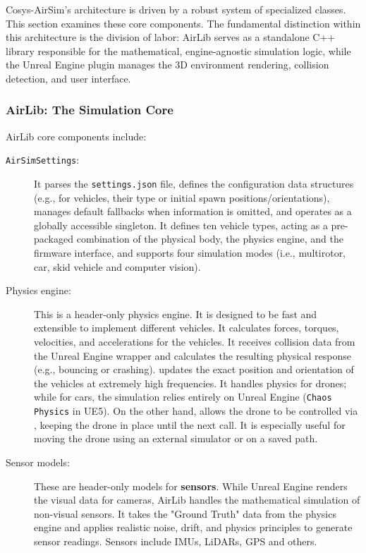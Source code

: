 Cosys-AirSim's architecture is driven by a robust system of specialized classes. This section examines these core components. The fundamental distinction within this architecture is the division of labor: AirLib serves as a standalone C++ library responsible for the mathematical, engine-agnostic simulation logic, while the Unreal Engine plugin manages the 3D environment rendering, collision detection, and user interface.

\subsubsection{AirLib: The Simulation Core}
\noindent
AirLib core components include:

\begin{description}
    \item[\texttt{AirSimSettings}:] It parses the \texttt{settings.json} file, defines the configuration data structures (e.g., for vehicles, their type or initial spawn positions/orientations), manages default fallbacks when information is omitted, and operates as a globally accessible singleton.
    It defines ten vehicle types, acting as a pre-packaged combination of the physical body, the physics engine, and the firmware interface, and supports four simulation modes (i.e., multirotor, car, skid vehicle and computer vision).
    \item[Physics engine:]  This is a header-only physics engine. It is designed to be fast and extensible to implement different vehicles. It calculates forces, torques, velocities, and accelerations for the vehicles. It receives collision data from the Unreal Engine wrapper and calculates the resulting physical response (e.g., bouncing or crashing).
    \texttt{} updates the exact position and orientation of the vehicles at extremely high frequencies. It handles physics for drones; while for cars, the simulation relies entirely on Unreal Engine (\texttt{Chaos} \texttt{Physics} in UE5). On the other hand, \texttt{} allows the drone to be controlled via \texttt{}, keeping the drone in place until the next call. It is especially useful for moving the drone using an external simulator or on a saved path.
    \item[Sensor models:] These are header-only models for \textbf{sensors}. While Unreal Engine renders the visual data for cameras, AirLib handles the mathematical simulation of non-visual sensors. It takes the "Ground Truth" data from the physics engine and applies realistic noise, drift, and physics principles to generate sensor readings. Sensors include IMUs, LiDARs, GPS and others.

\end{description}

